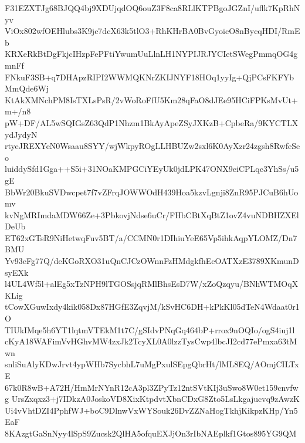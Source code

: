 F31EZXTJg68BJQQ4bj9XDUjqdOQ6ouZ3F8ca8RLlKTPBgoJGZnI/uflk7KpRhNyv
ViOx802wfOEHlubs3K9jc7dcX63k5tlO3+RhKHrBA0BvGyoicO8nBycqHDI/RmEb
KRXeRkBtDgFkjcIHzpFePFtiYwumUuLlnLH1NYPIJRJYCIetSWegPmmqOG4gmnFf
FNkuF3SB+q7DHApzRIPI2WWMQKNrZKIJNYF18HOq1yyIg+QjPCsFKFYbMmQde6Wj
KtAkXMNchPM8IsTXLsPsR/2vWoRoFfU5Km28qFaO8dJEe95HCiFPKsMvUt+m+/n8
pW+DF/AL5wSQIGsZ63QdP1Nhzm1BkAyApeZSyJXKzB+CpbeRa/9KYCTLXydJydyN
rtyeJREXYeN0Wsaau8SYY/wjWkpyROgLLHBUZw2sxl6K0AyXzr24zgsh8RwfeSeo
luiddySfd1Gga++S5i+31NOaKMPGCiYEyUk0jdLPK47ONX9eiCPLqc3YhSs/u5gE
BbWr20BkuSVDwcpet7f7vZFrqJOWWOdH439Hoa5kzvLgnji8ZnR95PJCuB6hUomv
kvNgMRImdaMDW66Ze+3PbkovjNdse6uCr/FHbCBtXqBtZ1ovZ4vuNDBHZXElDeUb
ET62xGTsR9NiHetwqFuv5BT/a/CCMN0r1DIhiuYeE65Vp5ihkAqpYLOMZ/Dn7BMU
Yv93eFg77Q/deKGoRXO31uQnCJCzOWnnFzHMdgkfhEcOATXzE3789XKmunDsyEXk
l4UL4Wf5l+alEg5xTzNPH9lTGOSsjqRMlBhsEsD7W/xZoQzqyu/BNhWTMOqXKLig
tCowXGuwIxdy4kik058Dx87HGfE3ZqvjM/kSvHC6DH+kPkKl05dTeN4Wdaat0r1O
TIUkIMqe5h6YT1lqtmVTEkM1t7C/gSIdvPNqGq464bP+rrox9nOQIo/ogS4iuj1l
cKyA18WAFimVvHGhvMW4zxJk2TcyXL0A0lzzTysCwp4lbcJI2cd77ePmxa63tMwn
snliSuAlyKDwJrvt4ypWHb7SycbhL7uMgPxulSEpgQbrHt/lML8EQ/AOmjCILTxE
67k0R8wB+A72H/HmMrNYnR12cA3pl3ZPyTz12ntSVtKIj3uSwo8W0et159cnvfwg
UrsZxqxz3+j7IDkzA0JoskoVD8XixKtpdvtXbnCDxG8Zto5LsLkgajucvq9zAwzK
Ui4vVhtDZI4PphfWJ+boC9DlnwVxWYSouk26DvZZNaHogTkhjKikpzKHp/Yn5EaF
8KAzgtGaSnNyy4lSpS9Zucsk2QlHA5ofquEXJjOn3rIbNAEplkf1Gtos895YG9QM
